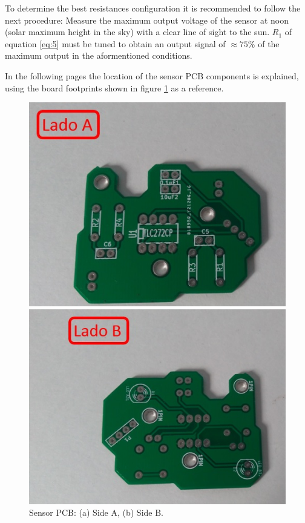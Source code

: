 \documentclass[12pt,letterpaper]{article}
\numberwithin{figure}{section}
\numberwithin{equation}{section}
\numberwithin{table}{section}
\begin{document}
To determine the best resistances configuration it is recommended to follow the next procedure: Measure the maximum output voltage of the sensor at noon (solar maximum height in the sky) with a clear line of sight to the sun. $R_1$ of equation \ref{eq:5} must be tuned to obtain an output signal of $\approx 75\%$ of the maximum output in the aformentioned conditions.

In the following pages the location of the sensor PCB components is explained, using the board footprints shown in figure \ref{fig:5} as a reference.

\begin{figure}[H]
   \centering
    \begin{minipage}{.5\textwidth}
    \centering
    \includegraphics[width=\linewidth]{Figuras/figure_5_a.jpg}
    \end{minipage}%
    \begin{minipage}{0.5\textwidth}
    \centering
    \includegraphics[width=\linewidth]{Figuras/figure_5_b.jpg}   
    \end{minipage}
    \caption{Sensor PCB: (a) Side A, (b) Side B.}
    \label{fig:5}
\end{figure}
\end{document}
